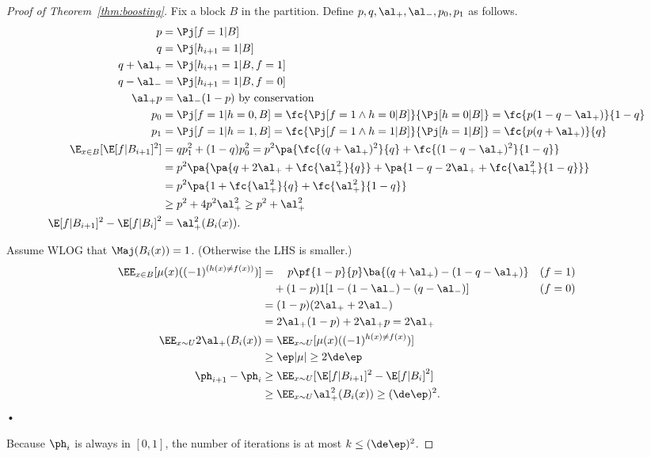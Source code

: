 \begin{proof}[Proof of Theorem~\ref{thm:boosting}]
Fix a block $B$ in the partition. Define $p,q,\al_+,\al_-,p_0,p_1$ as follows. 
\begin{align}
p&=\Pj[f=1|B]\\
q&=\Pj[h_{i+1} = 1|B]\\ %
q+\al_+ &= \Pj[h_{i+1}=1|B, f=1]\\ %
q-\al_- &= \Pj[h_{i+1}=1|B, f=0]\\ %
\al_+p &= \al_-(1-p) \text{ by conservation}\\
p_0&= \Pj[f=1|h=0,B] = \fc{\Pj[f=1\wedge h=0|B]}{\Pj[h=0|B]} = \fc{p(1-q-\al_+)}{1-q}\\
p_1&= \Pj[f=1|h=1,B] = \fc{\Pj[f=1\wedge h=1|B]}{\Pj[h=1|B]} = \fc{p(q+\al_+)}{q}\\
\E_{x\in B} [\E[f|B_{i+1}]^2]&=qp_1^2 + (1-q)p_0^2 = p^2 \pa{\fc{(q+\al_+)^2}{q} + \fc{(1-q-\al_+)^2}{1-q}} \\
&=p^2\pa{
\pa{q+2\al_+ + \fc{\al_+^2}{q}}
+
\pa{1-q-2\al_+ + \fc{\al_+^2}{1-q}}
}
\\
&=p^2\pa{1+\fc{\al_+^2}{q} + \fc{\al_+^2}{1-q}}\\
&\ge p^2 + 4p^2 \al_+^2 \ge
p^2+
 \al_+^2\\
\E[f|B_{i+1}]^2 - \E[f|B_i]^2%
&=\al_+^2(B_i(x)).
\end{align}


Assume WLOG that $\Maj(B_i(x))=1$.  (Otherwise the LHS is smaller.)
\begin{align}
\EE_{x\in B}[\mu(x) ((-1)^{(h(x)\ne f(x))})]
&=\quad p\pf{1-p}{p} \ba{(q+\al_+) - (1-q-\al_+)}&(f=1)\\
&\quad +(1-p) 1 [1-(1-\al_-) - (q-\al_-)]&(f=0)\\
&=(1-p) (2\al_++2\al_-)\\
&= 2\al_+(1-p) + 2\al_+p=2\al_+\\
\EE_{x\sim U} 2\al_+(B_i(x)) 
&=\EE_{x\sim U} [\mu(x) ((-1)^{h(x)\ne f(x)})]\\
&\ge \ep|\mu| \ge 2\de \ep\\
\ph_{i+1}-\ph_i &\ge 
\EE_{x\sim U} [\E[f|B_{i+1}]^2 - \E[f|B_i]^2]\\
&\ge 
\EE_{x\sim U} \al_+^2(B_i(x))\ge  (\de\ep)^2.
\end{align}•

Because $\ph_i$ is always in $[0,1]$, the number of iterations is at most $k\le (\de \ep)^2$.
\end{proof}

